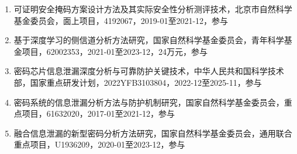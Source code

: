 {
	\setlist[enumerate]{}%
	\begin{enumerate}
		\item 可证明安全掩码方案设计方法及其实际安全性分析测评技术，北京市自然科学基金委员会，面上项目，4192067，2019-01至2021-12，参与
		\item 基于深度学习的侧信道分析方法研究，国家自然科学基金委员会，青年科学基金项目，62002353，2021-01至2023-12，24万元，参与
		\item 密码芯片信息泄漏深度分析与可靠防护关键技术，中华人民共和国科学技术部，国家重点研发计划，2022YFB3103804，2022-12至2025-11，参与
		\item 密码系统的信息泄漏分析方法与防护机制研究，国家自然科学基金委员会，重点项目，61632020，2017-01至2021-12，参与
		\item 融合信息泄漏的新型密码分析方法研究，国家自然科学基金委员会，通用联合重点项目，U1936209，2020-01至2023-12，参与
	\end{enumerate}  
}  
%

%



\cleardoublepage[plain]%

